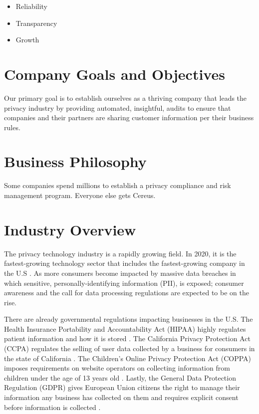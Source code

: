 \begin{itemize}
  \item Reliability
  \item Transparency
  \item Growth
\end{itemize}

\section{Company Goals and Objectives}

Our primary goal is to establish ourselves as a thriving company that leads the privacy industry by providing automated, insightful, audits to ensure that companies and their partners are sharing customer information per their business rules.

\section{Business Philosophy}

Some companies spend millions to establish a privacy compliance and risk management program. Everyone else gets Cereus.

\section{Industry Overview}

The privacy technology industry is a rapidly growing field. In 2020, it is the fastest-growing technology sector that includes the fastest-growing company in the U.S \cite{hughes.iapp.2020}. As more consumers become impacted by massive data breaches in which sensitive, personally-identifying information (PII), is exposed; consumer awareness and the call for data processing regulations are expected to be on the rise.

There are already governmental regulations impacting businesses in the U.S. The Health Insurance Portability and Accountability Act (HIPAA) highly regulates patient information and how it is stored \cite{cdc.2018}. The California Privacy Protection Act (CCPA) regulates the selling of user data collected by a business for consumers in the state of California \cite{calleg.2018}. The Children's Online Privacy Protection Act (COPPA) imposes requirements on website operators on collecting information from children under the age of 13 years old \cite{ftc.1998}. Lastly, the General Data Protection Regulation (GDPR) gives European Union citizens the right to manage their information any business has collected on them and requires explicit consent before information is collected \cite{eucomm.2016}.

